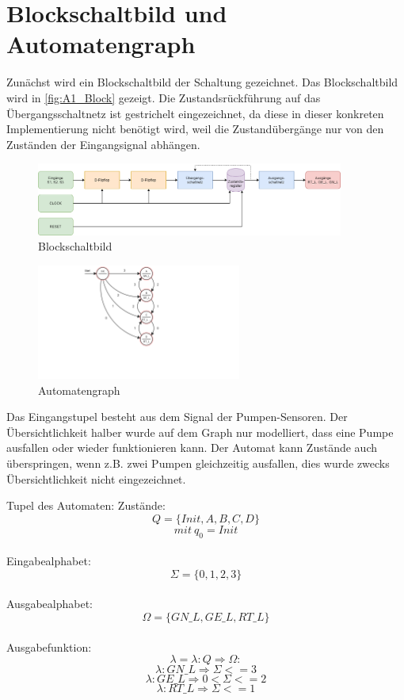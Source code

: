 \section{Blockschaltbild und Automatengraph}

Zunächst wird ein Blockschaltbild der Schaltung gezeichnet. Das Blockschaltbild wird in \autoref{fig:A1_Block} gezeigt. Die Zustandsrückführung auf das Übergangsschaltnetz ist gestrichelt eingezeichnet, da diese in dieser konkreten Implementierung nicht benötigt wird, weil die Zustandübergänge nur von den Zuständen der Eingangsignal abhängen.

\begin{figure}[H]
    \begin{center}
        \includegraphics[width=0.9\textwidth]{img/Blockschalt1.png}
        \caption{Blockschaltbild}
        \label{fig:A1_Block}
    \end{center}
\end{figure}


\begin{figure}[H]
    \begin{center}
        \includegraphics[width=0.6\textwidth]{img/Motortemp2.png}
        \caption{Automatengraph}
        \label{fig:A1_Auto}
    \end{center}
\end{figure}

Das Eingangstupel besteht aus dem Signal der Pumpen-Sensoren. Der Übersichtlichkeit halber wurde auf dem Graph nur modelliert, dass eine Pumpe ausfallen oder wieder funktionieren kann. Der Automat kann Zustände auch überspringen, wenn z.B. zwei Pumpen gleichzeitig ausfallen, dies wurde zwecks Übersichtlichkeit nicht eingezeichnet.
 
Tupel des Automaten:
Zustände:
\[Q =\{Init, A, B, C, D\}  \]
\[mit \ q_0 = Init \]\\
Eingabealphabet:
\[\Sigma =\{0,1,2,3\} \]\\
Ausgabealphabet:
\[\Omega = \{GN\_L, GE\_L, RT\_L\} \]\\
Ausgabefunktion:
\[\lambda = \lambda  : Q \Rightarrow \Omega: \]
\[  \lambda:GN\_L \Rightarrow \Sigma <= 3 \]
\[  \lambda:GE\_L \Rightarrow 0 < \Sigma <= 2  \]
\[  \lambda:RT\_L \Rightarrow  \Sigma <= 1  \]\\


